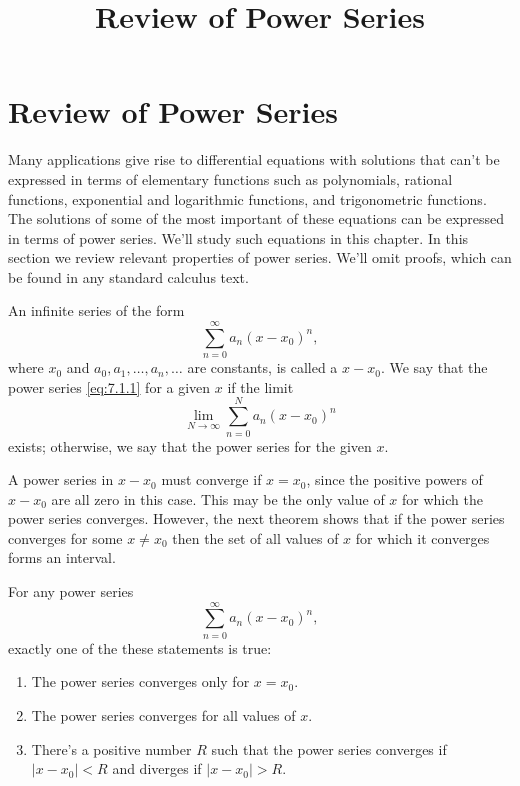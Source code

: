 \documentclass{ximera}
\title{Review of Power Series}%
\begin{document}
\begin{abstract}

\end{abstract}

\maketitle

\section*{Review of Power Series}

Many applications give rise to differential equations with solutions
that can't be expressed in terms of elementary functions such as
polynomials, rational functions, exponential and logarithmic
functions, and trigonometric functions. The solutions of some of the
most important of these equations can be expressed in terms of power
series. We'll study such equations in this chapter. In this section
we review relevant properties of power series. We'll omit proofs,
which can be found in any standard calculus text.

\begin{definition}\label{thmtype:7.1.1}
An infinite series of the form
\begin{equation} \label{eq:7.1.1}
\sum_{n=0}^\infty a_n(x-x_0)^n,
\end{equation}
where $x_0$ and $a_0, a_1, \dots, a_n, \dots$ are constants, is
called a
 $x-x_0$. We say that the power series
\eqref{eq:7.1.1}  for a given $x$ if the limit
$$
\lim_{N\rightarrow\infty}
\sum_{n=0}^Na_n(x-x_0)^n
$$
exists; otherwise, we say that the power series   for
the given $x$.
\end{definition}

A power series in $x-x_0$ must converge if $x=x_0$, since the positive
powers of $x-x_0$ are all zero in this case. This may be the only
value of $x$ for which the power series converges. However, the
next theorem shows that if the power series converges for some
$x\neq
x_0$ then the set of all values of $x$ for which it converges forms an interval.

\begin{theorem}\label{thmtype:7.1.2}
For any power series
$$
\sum_{n=0}^\infty a_n(x-x_0)^n,
$$
exactly one of the these statements is true$:$
\begin{enumerate}
\item\label{item:7.1.2a} %
The power series converges  only for $x=x_0.$
\item\label{item:7.1.2b} %
The power series converges for all values of $x.$
\item\label{item:7.1.2c} %
There's a positive number $R$ such that  the power series
converges if $|x-x_0|<R$ and diverges if  $|x-x_0|>R$.
\end{enumerate}
\end{theorem}
\end{document}
